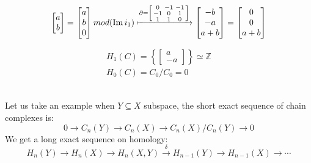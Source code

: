 \documentclass[11pt,a4paper]{report}
\DeclareMathOperator{\Ima}{Im}
\begin{document}
\begin{Ex}
                \begin{align*}
                  \begin{bmatrix}
                    a\\b
                  \end{bmatrix}
                  =
                  \begin{bmatrix}
                    a\\b\\0
                  \end{bmatrix} mod(\Ima i_1) \xmapsto{\partial = \left[\begin{smallmatrix}0&-1&-1\\-1&0&1\\1&1&0\end{smallmatrix}\right]} \begin{bmatrix}
                    -b\\-a\\a+b
                  \end{bmatrix}
                  =
                  \begin{bmatrix}
                    0\\0\\a+b
                  \end{bmatrix}
                \end{align*}

                \begin{align*}
                  H_1(C) = \left\{\begin{bmatrix}a\\-a\end{bmatrix}\right\} \simeq \mathbb{Z} \\
                  H_0(C) = C_0 / C_0 = 0
                \end{align*}
                \\
                \end{Ex}
                Let us take an example when $Y \subseteq X$ subspace, the short exact sequence of chain complexes is: \\
                \[
                0 \rightarrow C_n(Y) \rightarrow C_n(X) \rightarrow C_n(X) / C_n(Y) \rightarrow 0
                \]
                We get a long exact sequence on homology: \\
                \[ H_n(Y) \rightarrow H_n(X) \rightarrow H_n(X, Y) \xrightarrow{\delta} H_{n-1}(Y) \rightarrow H_{n-1}(X) \rightarrow \cdots \]
\end{document}
